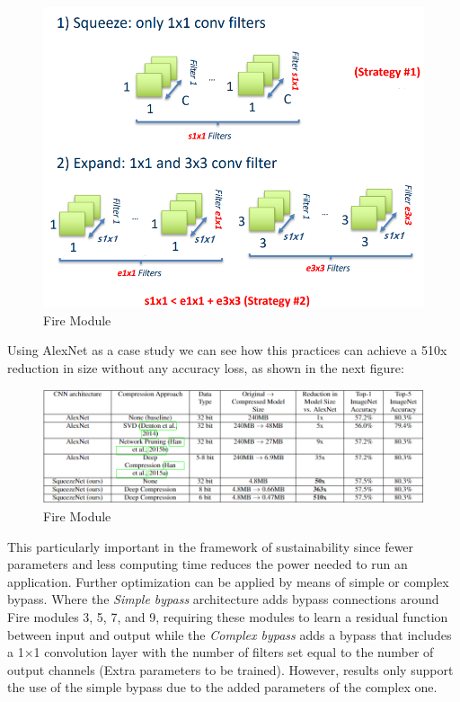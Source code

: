 \documentclass{article}
\begin{document}
        \begin{figure}[H]
          \includegraphics[scale=0.35]{../Images/FireModule.png}
          \centering
          \caption{Fire Module}
        \end{figure}

        Using AlexNet as a case study we can see how this practices can achieve a 510x reduction in size without any accuracy loss, as shown in the next figure:

        \begin{figure}[H]
          \includegraphics[scale=0.6]{../Images/squeezenettable.png}
          \centering
          \caption{Fire Module}
        \end{figure}

        This particularly important in the framework of sustainability since fewer parameters and less computing time reduces the power needed to run an application.
        Further optimization can be applied by means of simple or complex bypass. Where the \emph{Simple bypass} architecture adds bypass connections around Fire modules 3, 5, 7, and 9,
        requiring these modules to learn a residual function between input and output while the \emph{Complex bypass} adds a bypass that includes a 1$\times$1 convolution layer with the number of
        filters set equal to the number of output channels (Extra parameters to be trained). However, results only support the use of the simple bypass due to the added parameters of the complex one.
\end{document}

